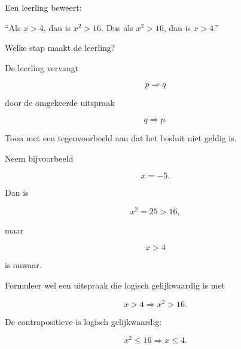 \documentclass{ximera}
\begin{document}
\begin{oefening}[Foutenanalyse]{\oefU\ESS}

Een leerling beweert:

\begin{center}
``Als $x>4$, dan is $x^2>16$.
Dus als $x^2>16$, dan is $x>4$.''
\end{center}

\begin{question}

Welke stap maakt de leerling?

\begin{oplossing}

De leerling vervangt

\[
p\Rightarrow q
\]

door de omgekeerde uitspraak

\[
q\Rightarrow p.
\]

\end{oplossing}

\end{question}


\begin{question}

Toon met een tegenvoorbeeld aan dat het besluit niet geldig is.

\begin{oplossing}

Neem bijvoorbeeld

\[
x=-5.
\]

Dan is

\[
x^2=25>16,
\]

maar

\[
x>4
\]

is onwaar.

\end{oplossing}

\end{question}


\begin{question}

Formuleer wel een uitspraak die logisch gelijkwaardig is met

\[
x>4\Rightarrow x^2>16.
\]

\begin{oplossing}

De contrapositieve is logisch gelijkwaardig:

\[
x^2\leq16\Rightarrow x\leq4.
\]

\end{oplossing}

\end{question}

\end{oefening}
\end{document}

